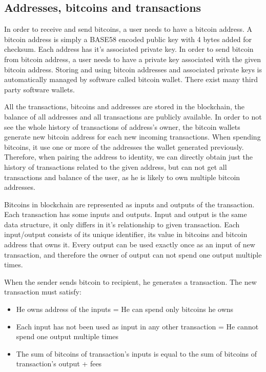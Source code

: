 \documentclass[
  digital, %
  table,   %
  lof,     %
  lot,     %
  oneside
]{fithesis3}
\begin{document}
\subsection{Addresses, bitcoins and transactions}
In order to receive and send bitcoins, a user needs to have a bitcoin address.
A bitcoin address is simply a BASE58 encoded public key with 4 bytes added for checksum.
Each address has it's associated private key.
In order to send bitcoin from bitcoin address, a user needs to have a private key associated with the given bitcoin address.
Storing and using bitcoin addresses and associated private keys is automatically managed
by software called bitcoin wallet. There exist many third party software wallets.

All the transactions, bitcoins and addresses are stored in the blockchain,
the balance of all addresses and all transactions are publicly available.
In order to not see the whole history of transactions of address's owner,
the bitcoin wallets generate new bitcoin address for each new incoming transactions. When spending bitcoins, it use one or more of the addresses the wallet generated previously.
Therefore, when pairing the address to identity, we can directly obtain just the history of transactions related to the given
address, but can not get all transactions and balance of the user, as he is likely to own multiple bitcoin addresses.

Bitcoins in blockchain are represented as inputs and outputs of the transaction.
Each transaction has some inputs and outputs. 
Input and output is the same data structure, it only differs in it's relationship to given transaction.
Each input/output consists of its unique identifier, its value in bitcoins and bitcoin address that owns it.
Every output can be used exactly once as an input of new transaction, and therefore the owner of output can not
spend one output multiple times.

When the sender sends bitcoin to recipient, he generates a transaction.
The new transaction must satisfy:
\begin{itemize}
  \item He owns address of the inputs = He can spend only bitcoins he owns
  \item Each input has not been used as input in any other transaction = He cannot spend one output multiple times
  \item The sum of bitcoins of transaction's inputs is equal to the sum of bitcoins of transaction's output + fees
\end{itemize}
\end{document}
